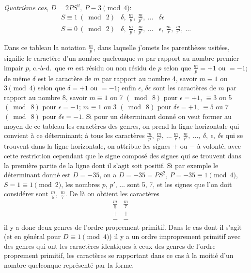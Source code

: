 \documentclass[11pt,a4paper]{article}
\theoremstyle{plain}
\begin{document}
\noindent\textit{Quatri\`eme cas}, $D = 2PS^2,\ P \equiv 3 \pmod{4}$:
\[
\begin{array}{l|l|l}
S \equiv 1\ (\bmod\ 2) & \delta,\ \tfrac{m}{p},\ \tfrac{m}{p'},\ \ldots & \delta\epsilon\\
S \equiv 0\ (\bmod\ 2) & \delta,\ \tfrac{m}{p},\ \tfrac{m}{p'},\ \ldots & \epsilon,\ \tfrac{m}{r},\ \tfrac{m}{r'},\ \ldots
\end{array}
\]

Dans ce tableau la notation $\tfrac{m}{p}$, dans laquelle j'omets les parenth\`eses usit\'ees, signifie le caract\`ere d'un nombre quelconque $m$ par rapport au nombre premier impair $p$, c.-\`a-d.\ que $m$ est r\'esidu ou non r\'esidu de $p$ selon que $\tfrac{m}{p} = +1$ ou $= -1$; de m\^eme $\delta$ est le caract\`ere de $m$ par rapport au nombre 4, savoir $m \equiv 1$ ou $3 \pmod 4$ selon que $\delta = +1$ ou $= -1$; enfin $\epsilon$, $\delta\epsilon$ sont les caract\`eres de $m$ par rapport au nombre 8, savoir $m \equiv 1$ ou 7 $(\bmod\ 8)$ pour $\epsilon = +1$, $\equiv 3$ ou 5 $(\bmod\ 8)$ pour $\epsilon = -1$; $m \equiv 1$ ou 3 $(\bmod\ 8)$ pour $\delta\epsilon = +1$, $\equiv 5$ ou 7 $(\bmod\ 8)$ pour $\delta\epsilon = -1$. Si pour un d\'eterminant donn\'e on veut former au moyen de ce tableau les caract\`eres des genres, on prend la ligne horizontale qui convient \`a ce d\'eterminant; \`a tous les caract\`eres $\tfrac{m}{p},\ \tfrac{m}{p'},\ \ldots\ \tfrac{m}{r},\ \tfrac{m}{r'},\ \ldots,\ \delta,\ \epsilon,\ \delta\epsilon$ qui se trouvent dans la ligne horizontale, on attribue les signes $+$ ou $-$ \`a volont\'e, avec cette restriction cependant que le signe compos\'e des signes qui se trouvent dans la premi\`ere partie de la ligne dont il s'agit soit positif. Si par exemple le d\'eterminant donn\'e est $D = -35$, on a $D = -35 = PS^2$, $P = -35 \equiv 1 \pmod 4$, $S = 1 \equiv 1 \pmod 2$, les nombres $p,\,p',\,\ldots$ sont 5, 7, et les signes que l'on doit consid\'erer sont $\tfrac{m}{5},\ \tfrac{m}{7}$. De l\`a on obtient les caract\`eres
\[
\begin{array}{c|c|c|c}
\tfrac{m}{5} & \tfrac{m}{7} & & \\ \hline
+ & + & & \\
- & - & &
\end{array}
\]
il y a donc deux genres de l'ordre proprement primitif. Dans le cas dont il s'agit (et en g\'en\'eral pour $D \equiv 1 \pmod 4$) il y a un ordre improprement primitif avec des genres qui ont les caract\`eres identiques \`a ceux des genres de l'ordre proprement primitif, les caract\`eres se rapportant dans ce cas \`a la moiti\'e d'un nombre quelconque repr\'esent\'e par la forme.
\end{document}
